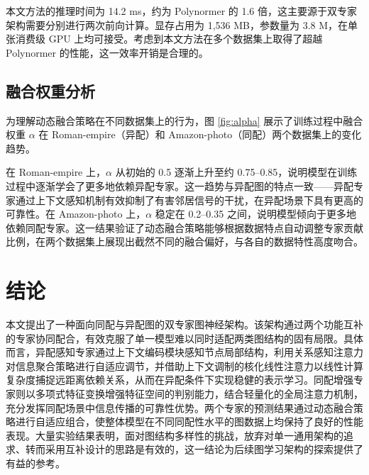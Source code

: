 \documentclass[a4paper,10pt]{article}
\begin{document}
本文方法的推理时间为 14.2 ms，约为 Polynormer 的 1.6 倍，这主要源于双专家架构需要分别进行两次前向计算。显存占用为 1,536 MB，参数量为 3.8 M，在单张消费级 GPU 上均可接受。考虑到本文方法在多个数据集上取得了超越 Polynormer 的性能，这一效率开销是合理的。

\subsection{融合权重分析}

为理解动态融合策略在不同数据集上的行为，图 \ref{fig:alpha} 展示了训练过程中融合权重 $\alpha$ 在 Roman-empire（异配）和 Amazon-photo（同配）两个数据集上的变化趋势。

在 Roman-empire 上，$\alpha$ 从初始的 0.5 逐渐上升至约 0.75--0.85，说明模型在训练过程中逐渐学会了更多地依赖异配专家。这一趋势与异配图的特点一致——异配专家通过上下文感知机制有效抑制了有害邻居信号的干扰，在异配场景下具有更高的可靠性。在 Amazon-photo 上，$\alpha$ 稳定在 0.2--0.35 之间，说明模型倾向于更多地依赖同配专家。这一结果验证了动态融合策略能够根据数据特点自动调整专家贡献比例，在两个数据集上展现出截然不同的融合偏好，与各自的数据特性高度吻合。


\section{结论}

本文提出了一种面向同配与异配图的双专家图神经架构。该架构通过两个功能互补的专家协同配合，有效克服了单一模型难以同时适配两类图结构的固有局限。具体而言，异配感知专家通过上下文编码模块感知节点局部结构，利用关系感知注意力对信息聚合策略进行自适应调节，并借助上下文调制的核化线性注意力以线性计算复杂度捕捉远距离依赖关系，从而在异配条件下实现稳健的表示学习。同配增强专家则以多项式特征变换增强特征空间的判别能力，结合轻量化的全局注意力机制，充分发挥同配场景中信息传播的可靠性优势。两个专家的预测结果通过动态融合策略进行自适应组合，使整体模型在不同同配性水平的图数据上均保持了良好的性能表现。大量实验结果表明，面对图结构多样性的挑战，放弃对单一通用架构的追求、转而采用互补设计的思路是有效的，这一结论为后续图学习架构的探索提供了有益的参考。
\end{document}
